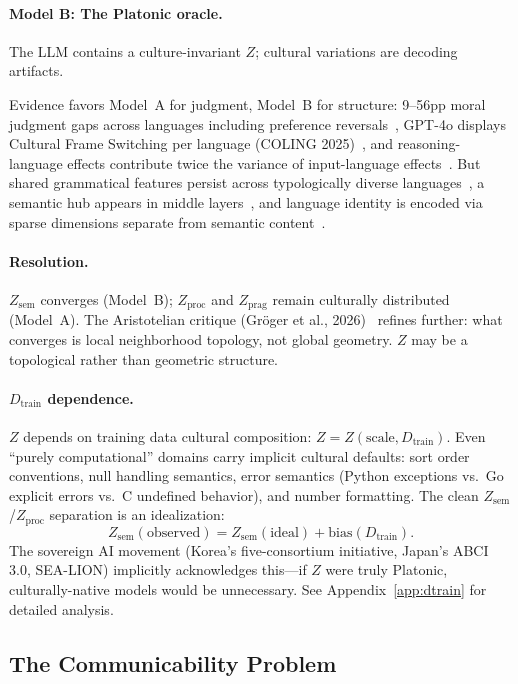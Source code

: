 \documentclass[11pt]{article}
\theoremstyle{definition}
\newcommand{\Zsem}{Z_{\text{sem}}}
\newcommand{\Zproc}{Z_{\text{proc}}}
\newcommand{\Zprag}{Z_{\text{prag}}}
\newcommand{\Dtrain}{D_{\text{train}}}
\begin{document}
\paragraph{Model B: The Platonic oracle.}
The LLM contains a culture-invariant $Z$; cultural variations are decoding artifacts.

Evidence favors Model~A for judgment, Model~B for structure: 9--56pp moral judgment gaps across languages including preference reversals~\cite{vida2024moral,agarwal2024ethical}, GPT-4o displays Cultural Frame Switching per language (COLING 2025)~\cite{ahn2025coling}, and reasoning-language effects contribute twice the variance of input-language effects~\cite{li2026reasoning}. But shared grammatical features persist across typologically diverse languages~\cite{brinkmann2025shared}, a semantic hub appears in middle layers~\cite{wu2025semantichub}, and language identity is encoded via sparse dimensions separate from semantic content~\cite{zhong2025sparse}.

\paragraph{Resolution.}
$\Zsem$ converges (Model~B); $\Zproc$ and $\Zprag$ remain culturally distributed (Model~A). The Aristotelian critique (Gr\"{o}ger et al., 2026)~\cite{groger2026aristotelian} refines further: what converges is local neighborhood topology, not global geometry. $Z$ may be a topological rather than geometric structure.

\paragraph{$\Dtrain$ dependence.}
$Z$ depends on training data cultural composition: $Z = Z(\text{scale}, \Dtrain)$. Even ``purely computational'' domains carry implicit cultural defaults: sort order conventions, null handling semantics, error semantics (Python exceptions vs.\ Go explicit errors vs.\ C undefined behavior), and number formatting. The clean $\Zsem$/$\Zproc$ separation is an idealization:
\[
\Zsem(\text{observed}) = \Zsem(\text{ideal}) + \mathrm{bias}(\Dtrain).
\]
The sovereign AI movement (Korea's five-consortium initiative, Japan's ABCI 3.0, SEA-LION) implicitly acknowledges this---if $Z$ were truly Platonic, culturally-native models would be unnecessary. See Appendix~\ref{app:dtrain} for detailed analysis.

\subsection{The Communicability Problem}\label{sec:communicability}
\end{document}
